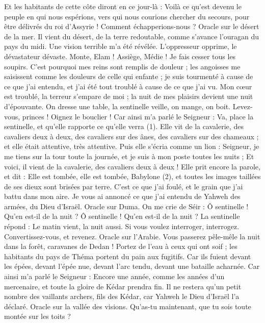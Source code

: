 \begin{multicols}{2}
{Et les habitants de cette côte diront en ce jour-là : Voilà ce qu’est devenu le peuple en qui nous espérions, vers qui nous courions chercher du secours, pour être délivrés du roi d’Assyrie ! Comment échapperions-nous ?
\VerseOne{}Oracle sur le désert de la mer. Il vient du désert, de la terre redoutable, comme s’avance l’ouragan du pays du midi.
Une vision terrible m'a été révélée. L’oppresseur opprime, le dévastateur dévaste. Monte, Elam ! Assiège, Médie ! Je fais cesser tous les soupirs.
C'est pourquoi mes reins sont remplis de douleur ; les angoisses me saisissent comme les douleurs de celle qui enfante ; je suis tourmenté à cause de ce que j'ai entendu, et j'ai été tout troublé à cause de ce que j'ai vu.
Mon cœur est troublé, la terreur s’empare de moi ; la nuit de mes plaisirs devient une nuit d’épouvante.
On dresse une table, la sentinelle veille, on mange, on boit. Levez-vous, princes ! Oignez le bouclier !
Car ainsi m’a parlé le Seigneur : Va, place la sentinelle, et qu'elle rapporte ce qu'elle verra (1).
Elle vit de la cavalerie, des cavaliers deux à deux, des cavaliers sur des ânes, des cavaliers sur des chameaux ; et elle était attentive, très attentive.
Puis elle s’écria comme un lion : Seigneur, je me tiens sur la tour toute la journée, et je suis à mon poste toutes les nuits ;
Et voici, il vient de la cavalerie, des cavaliers deux à deux ! Elle prit encore la parole, et dit : Elle est tombée, elle est tombée, Babylone (2), et toutes les images taillées de ses dieux sont brisées par terre.
C'est ce que j'ai foulé, et le grain que j'ai battu dans mon aire. Je vous ai annoncé ce que j'ai entendu de Yahweh des armées, du Dieu d'Israël.
Oracle sur Duma. On me crie de Séir : Ô sentinelle ! Qu’en est-il de la nuit ? Ô sentinelle ! Qu’en est-il de la nuit ?
La sentinelle répond : Le matin vient, la nuit aussi. Si vous voulez interroger, interrogez. Convertissez-vous, et revenez.
Oracle sur l'Arabie. Vous passerez pêle-mêle la nuit dans la forêt, caravanes de Dedan !
Portez de l’eau à ceux qui ont soif ; les habitants du pays de Théma portent du pain aux fugitifs.
Car ils fuient devant les épées, devant l'épée nue, devant l'arc tendu, devant une bataille acharnée.
Car ainsi m’a parlé le Seigneur : Encore une année, comme les années d’un mercenaire, et toute la gloire de Kédar prendra fin.
Il ne restera qu’un petit nombre des vaillants archers, fils des Kédar, car Yahweh le Dieu d'Israël l’a déclaré.
\VerseOne{}Oracle sur la vallée des visions. Qu'as-tu maintenant, que tu sois toute montée sur les toits ?
}
\end{multicols}
